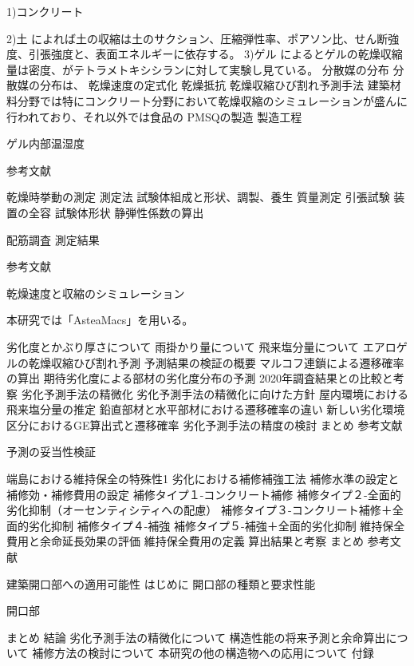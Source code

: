 \documentclass[./main]{subfiles}
\begin{document}
			1)コンクリート
				
			2)土
				\cite{Morris1992CrackingID}によれば土の収縮は土のサクション、圧縮弾性率、ポアソン比、せん断強度、引張強度と、表面エネルギーに依存する。
			3)ゲル
				\cite{SMITH1995191}によるとゲルの乾燥収縮量は密度、\cite{NILSEN1997135}がテトラメトキシシランに対して実験し見ている。
		分散媒の分布
			分散媒の分布は、
		乾燥速度の定式化
		乾燥抵抗
	乾燥収縮ひび割れ予測手法
		建築材料分野では特にコンクリート分野において乾燥収縮のシミュレーションが盛んに行われており、それ以外では食品の
	PMSQの製造
		製造工程
		
		ゲル内部温湿度
		
	
		
	参考文献

乾燥時挙動の測定
	測定法
		試験体組成と形状、調製、養生
		質量測定
		引張試験
			装置の全容
			試験体形状
			静弾性係数の算出

		配筋調査
	測定結果
		
	参考文献

乾燥速度と収縮のシミュレーション
	
	本研究では「AsteaMacs」を用いる。
		
		劣化度とかぶり厚さについて
		雨掛かり量について
		飛来塩分量について
	エアロゲルの乾燥収縮ひび割れ予測
		予測結果の検証の概要
		マルコフ連鎖による遷移確率の算出
		期待劣化度による部材の劣化度分布の予測
		2020年調査結果との比較と考察
	劣化予測手法の精微化
		劣化予測手法の精微化に向けた方針
		屋内環境における飛来塩分量の推定
		鉛直部材と水平部材における遷移確率の違い
		新しい劣化環境区分におけるGE算出式と遷移確率
	劣化予測手法の精度の検討
	まとめ
	参考文献

予測の妥当性検証
	
	端島における維持保全の特殊性1
	劣化における補修補強工法
	補修水準の設定と補修効・補修費用の設定
		補修タイプ１-コンクリート補修
		補修タイプ２-全面的劣化抑制（オーセンティシティへの配慮）
		補修タイプ３-コンクリート補修＋全面的劣化抑制
		補修タイプ４-補強
		補修タイプ５-補強＋全面的劣化抑制
	維持保全費用と余命延⻑効果の評価
		維持保全費用の定義
		算出結果と考察
	まとめ
	参考文献

建築開口部への適用可能性
	はじめに
		開口部の種類と要求性能
		
	開口部

まとめ
	結論
		劣化予測手法の精微化について
		構造性能の将来予測と余命算出について
		補修方法の検討について
	本研究の他の構造物への応用について
付録


\end{document}
